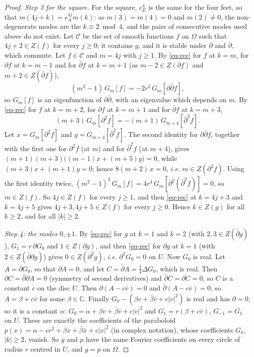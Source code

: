 \documentclass[a4paper,11pt,twoside,leqno]{article}
\newcommand{\ie}[0]{\emph{i.e.} }
\numberwithin{equation}{section}
\begin{document}
\begin{proof}
\emph{Step 3 for the square.} For the square, $e_E^4$ is the same for the four feet, so that $m(4j+k) = e_A^{4j} m(k)$: as $m(3) = m(4) = 0$ and $m(2) \neq 0$, the non-degenerate modes are the $k \equiv 2 \bmod 4$, and the pairs of consecutive modes used above do not exist. Let $\mathcal{C}$ be the set of smooth functions $f$ on $\Omega$ such that $4j+2 \in Z(f)$ for every $j \geq 0$; it contains $g$, and it is stable under $\partial$ and $\bar\partial$, which commute. Let $f \in \mathcal{C}$ and $m = 4j$ with $j \geq 1$. By \eqref{eq-rec} for $f$ at $k = m$, for $\partial f$ at $k = m-1$ and for $\bar\partial f$ at $k = m+1$ (as $m-2 \in Z(\partial f)$ and $m+2 \in Z(\bar\partial f)$),
\[
(m^2-1)\, G_m[f] = -2r^2\, G_m[\partial\bar\partial f],
\]
so $G_m[f]$ is an eigenfunction of $\partial\bar\partial$, with an eigenvalue which depends on $m$. By \eqref{eq-rec} for $f$ at $k = m+2$, for $\partial f$ at $k = m+1$ and for $\bar\partial f$ at $k = m+3$,
\[
(m+3)\, G_m[\partial^2 f] = -(m+1)\, G_{m+4}[\bar\partial^2 f].
\]
Let $x = G_m[\partial^2 f]$ and $y = G_{m+4}[\bar\partial^2 f]$. The second identity for $\partial\bar\partial f$, together with the first one for $\partial^2 f$ (at $m$) and for $\bar\partial^2 f$ (at $m+4$), gives $(m+1)(m+3)\big((m-1)x + (m+5)y\big) = 0$, while $(m+3)x + (m+1)y = 0$; hence $8(m+2)\,x = 0$, \ie $m \in Z(\partial^2 f)$. Using the first identity twice, $(m^2-1)^2\, G_m[f] = 4r^4\, G_m[\partial^2 (\bar\partial^2 f)] = 0$, so $m \in Z(f)$. So $4j \in Z(f)$ for every $j \geq 1$, and then \eqref{eq-rec} at $k = 4j+3$ and $k = 4j+5$ gives $4j+3, 4j+5 \in Z(f)$ for every $j \geq 0$. Hence $k \in Z(g)$ for all $k \geq 2$, and for all $|k| \geq 2$.

\emph{Step 4: the modes $0, \pm 1$.} By \eqref{eq-rec} for $g$ at $k = 1$ and $k = 2$ (with $2, 3 \in Z(\bar\partial g)$), $G_1 = r\, \partial G_0$ and $1 \in Z(\partial g)$, and then \eqref{eq-rec} for $\partial g$ at $k = 1$ (with $2 \in Z(\bar\partial\partial g)$) gives $0 \in Z(\partial^2 g)$, \ie $\partial^2 G_0 = 0$ on $U$. Now $G_0$ is real. Let $A = \partial G_0$, so that $\partial A = 0$, and let $C = \bar\partial A = \frac14 \Delta G_0$, which is real. Then $\partial C = \bar\partial \partial A = 0$ (symmetry of second derivatives) and $\bar\partial C = \overline{\partial C} = 0$, so $C$ is a constant $c$ on the disc $U$. Then $\partial(A - c\bar v) = 0$ and $\bar\partial(A - c \bar v) = 0$, so $A = \beta + c\bar v$ for some $\beta \in \mathbb{C}$. Finally $G_0 - (\beta v + \bar\beta \bar v + c|v|^2)$ is real and has $\partial = 0$, so it is a constant $\alpha$: $G_0 = \alpha + \beta v + \bar \beta \bar v + c|v|^2$ and $G_1 = r(\beta + c\bar v)$, $G_{-1} = \overline{G_1}$ on $U$. These are exactly the coefficients of the paraboloid $p(x) = \alpha - cr^2 + \beta x + \bar\beta \bar x + c|x|^2$ (in complex notation), whose coefficients $G_k$, $|k| \geq 2$, vanish. So $g$ and $p$ have the same Fourier coefficients on every circle of radius $r$ centred in $U$, and $g = p$ on $\Omega$.


\end{proof}
\end{document}
